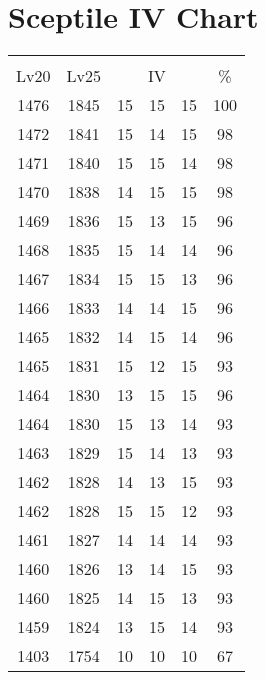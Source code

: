 \documentclass{article}%
\begin{document}
%
\normalsize%
\section{Sceptile IV Chart}%
\label{sec:Sceptile IV Chart}%
\renewcommand{\arraystretch}{1.5}%
\begin{tabular}{|c|c|c|c|c|c|}%
\hline%
\multicolumn{6}{|c|}{\textcolor{white}{ 
\linebreak{Sceptile}
}%
\cellcolor{black}}\\%
\multicolumn{1}{|c}{Lv20}&\multicolumn{1}{c|}{Lv25}&\multicolumn{3}{c|}{IV}&\multicolumn{1}{|c|}{\%}\\%
\hline%
\rowcolor{color100}%
1476&1845&15&15&15&100\\%
\hline%
\rowcolor{color98}%
1472&1841&15&14&15&98\\%
\hline%
\rowcolor{color98}%
1471&1840&15&15&14&98\\%
\hline%
\rowcolor{color98}%
1470&1838&14&15&15&98\\%
\hline%
\rowcolor{color96}%
1469&1836&15&13&15&96\\%
\hline%
\rowcolor{color96}%
1468&1835&15&14&14&96\\%
\hline%
\rowcolor{color96}%
1467&1834&15&15&13&96\\%
\hline%
\rowcolor{color96}%
1466&1833&14&14&15&96\\%
\hline%
\rowcolor{color96}%
1465&1832&14&15&14&96\\%
\hline%
\rowcolor{color93}%
1465&1831&15&12&15&93\\%
\hline%
\rowcolor{color96}%
1464&1830&13&15&15&96\\%
\hline%
\rowcolor{color93}%
1464&1830&15&13&14&93\\%
\hline%
\rowcolor{color93}%
1463&1829&15&14&13&93\\%
\hline%
\rowcolor{color93}%
1462&1828&14&13&15&93\\%
\hline%
\rowcolor{color93}%
1462&1828&15&15&12&93\\%
\hline%
\rowcolor{color93}%
1461&1827&14&14&14&93\\%
\hline%
\rowcolor{color93}%
1460&1826&13&14&15&93\\%
\hline%
\rowcolor{color93}%
1460&1825&14&15&13&93\\%
\hline%
\rowcolor{color93}%
1459&1824&13&15&14&93\\%
\hline%
\rowcolor{color91}%
1403&1754&10&10&10&67\\%
\end{tabular}

%
\end{document}
